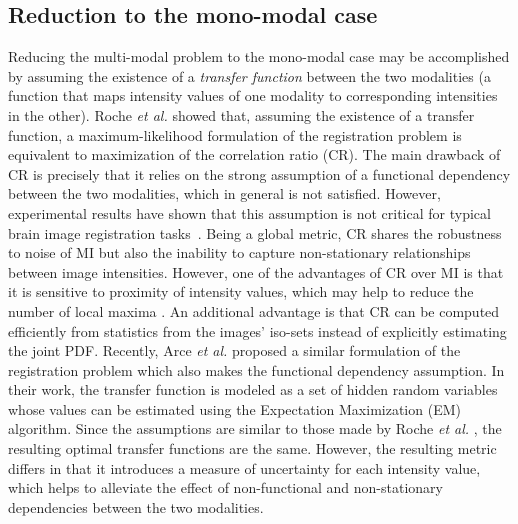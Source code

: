 \closer
\subsection{Reduction to the mono-modal case}
Reducing the multi-modal problem to the mono-modal case may be accomplished by assuming the existence of a {\it transfer function} between the two modalities (a function that maps intensity values of one modality to corresponding intensities in the other). Roche {\it et al.} \cite{Roche2000} showed that, assuming the existence of a transfer function, a maximum-likelihood formulation of the registration problem is equivalent to maximization of the correlation ratio (CR). The main drawback of CR is precisely that it relies on the strong assumption of a functional dependency between the two modalities, which in general is not satisfied. However, experimental results have shown that this assumption is not critical for typical brain image registration tasks~\citep{Roche1998}. Being a global metric, CR shares the robustness to noise of MI but also the inability to capture non-stationary relationships between image intensities. However, one of the advantages of CR over MI is that it is sensitive to proximity of intensity values, which may help to reduce the number of local maxima \citep{Roche1998}. An additional advantage is that CR can be computed efficiently from statistics from the images' iso-sets instead of explicitly estimating the joint PDF. Recently, Arce {\it et al.} \cite{Arce-santana2014} proposed a similar formulation of the registration problem which also makes the functional dependency assumption. In their work, the transfer function is modeled as a set of hidden random variables whose values can be estimated using the Expectation Maximization (EM) algorithm. Since the assumptions are similar to those made by Roche {\it et al.} \cite{Roche1998, Roche2000}, the resulting optimal transfer functions are the same. However, the resulting metric differs in that it introduces a measure of uncertainty for each intensity value, which helps to alleviate the effect of non-functional and non-stationary dependencies between the two modalities.

